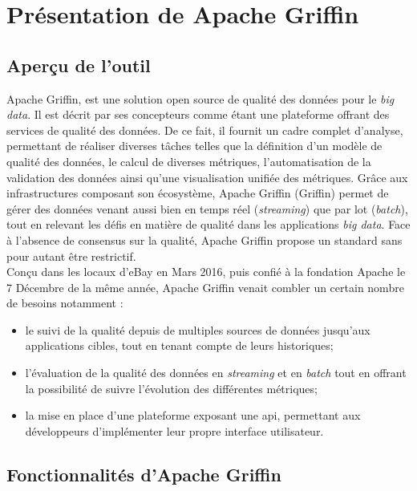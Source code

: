 \section{Pr\'esentation de Apache Griffin}


\subsection{Aperçu de l'outil}
Apache Griffin, est une solution open source de qualit\'e des donn\'ees pour le \textit{big data}. Il est d\'ecrit par ses concepteurs comme \'etant une plateforme offrant des services de qualit\'e des donn\'ees. De ce fait, il fournit un cadre complet d'analyse, permettant de r\'ealiser diverses t\^aches telles que la d\'efinition d'un mod\`ele de qualit\'e des donn\'ees, le calcul de diverses m\'etriques, l'automatisation de la validation des donn\'ees ainsi qu'une visualisation unifiée des m\'etriques. Gr\^ace aux infrastructures composant son \'ecosyst\`eme, Apache Griffin (Griffin) permet de g\'erer des donn\'ees venant aussi bien en temps r\'eel (\textit{streaming}) que par lot (\textit{batch}), tout en relevant les d\'efis en mati\`ere de qualit\'e dans les applications \textit{big data}. Face \`a l'absence de consensus sur la qualit\'e, Apache Griffin propose un standard sans pour autant \^etre restrictif.
\\

Conçu dans les locaux d'eBay en Mars 2016, puis confi\'e \`a la fondation Apache le 7 D\'ecembre de la m\^eme ann\'ee, Apache Griffin venait combler un certain nombre de besoins notamment \cite{ApacheGriffinIntro} : 
\begin{itemize}[parsep=0cm,itemsep=0cm]
\item le suivi de la qualit\'e  depuis de multiples sources de donn\'ees jusqu'aux applications cibles, tout en tenant compte de leurs historiques;

\item l'\'evaluation de la qualit\'e des donn\'ees en \textit{streaming} et en \textit{batch} tout en offrant la possibilit\'e de suivre l'évolution des diff\'erentes m\'etriques;

\item la mise en place d'une plateforme exposant une \acrshort{api}, permettant aux développeurs d'impl\'ementer leur propre interface utilisateur.
\end{itemize}

\subsection{Fonctionnalit\'es  d'Apache Griffin}

